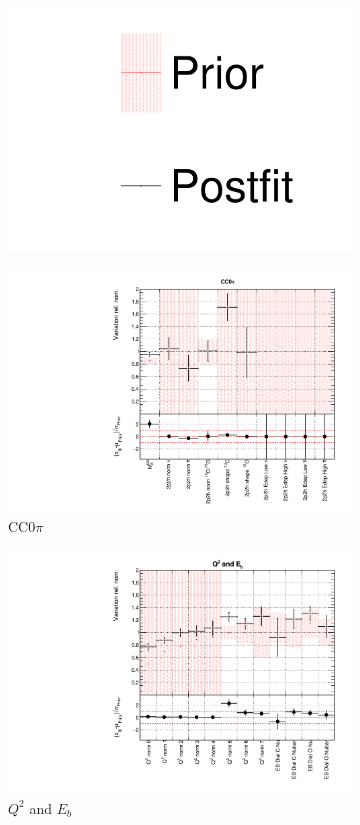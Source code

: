 \begin{figure}
\centering
\begin{subfigure}{0.95\textwidth}
  \centering
  \includegraphics[width=0.25\linewidth]{figs/dat_leg}
\end{subfigure}
\begin{subfigure}{0.49\textwidth}
  \centering
  \includegraphics[width=0.9\linewidth]{figs/datxsec1}
  \caption{CC0$\pi$}
\end{subfigure}
\begin{subfigure}{0.49\textwidth}
  \centering
  \includegraphics[width=0.9\linewidth]{figs/datxsec2}
  \caption{$Q^2$ and $E_b$}
\end{subfigure}
\begin{subfigure}{0.49\textwidth}

\end{subfigure}
\end{figure}
